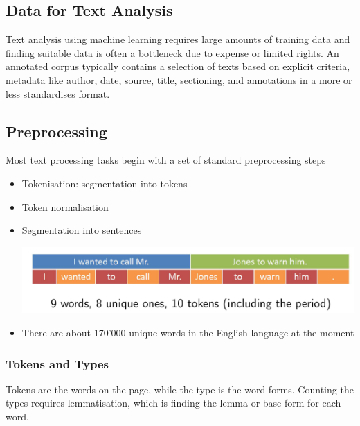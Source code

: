 \documentclass[11pt]{article}
\begin{document}
\subsection{Data for Text Analysis}
Text analysis using machine learning requires large amounts of training data and finding suitable data is often a bottleneck due to expense or limited rights. An annotated corpus typically contains a selection of texts based on explicit criteria, metadata like author, date, source, title, sectioning, and annotations in a more or less standardises format.

\subsection{Preprocessing}
Most text processing tasks begin with a set of standard preprocessing steps
\begin{itemize}
	\item Tokenisation: segmentation into tokens
	\item Token normalisation
	\item Segmentation into sentences
	\begin{center}
		\includegraphics[width=0.8\linewidth]{img/sentence_segmentation}
	\end{center}
	\item There are about 170'000 unique words in the English language at the moment
\end{itemize}

\subsubsection{Tokens and Types}
Tokens are the words on the page, while the type is the word forms. Counting the types requires lemmatisation, which is finding the lemma or base form for each word.
\end{document}
